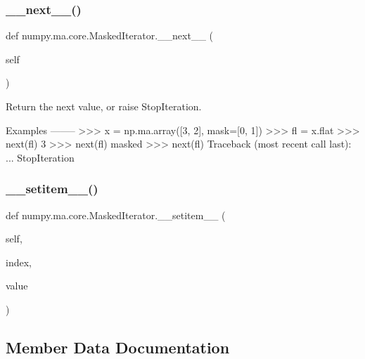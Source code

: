 \subsubsection{\texorpdfstring{\+\_\+\+\_\+next\+\_\+\+\_\+()}{\_\_next\_\_()}}
{\footnotesize\ttfamily def numpy.\+ma.\+core.\+Masked\+Iterator.\+\_\+\+\_\+next\+\_\+\+\_\+ (\begin{DoxyParamCaption}\item[{}]{self }\end{DoxyParamCaption})}

\begin{DoxyVerb}Return the next value, or raise StopIteration.

Examples
--------
>>> x = np.ma.array([3, 2], mask=[0, 1])
>>> fl = x.flat
>>> next(fl)
3
>>> next(fl)
masked
>>> next(fl)
Traceback (most recent call last):
  ...
StopIteration\end{DoxyVerb}
 \mbox{\label{classnumpy_1_1ma_1_1core_1_1MaskedIterator_a9d010e3bb8b98b905e2eb658a376544d}} 
\subsubsection{\texorpdfstring{\+\_\+\+\_\+setitem\+\_\+\+\_\+()}{\_\_setitem\_\_()}}
{\footnotesize\ttfamily def numpy.\+ma.\+core.\+Masked\+Iterator.\+\_\+\+\_\+setitem\+\_\+\+\_\+ (\begin{DoxyParamCaption}\item[{}]{self,  }\item[{}]{index,  }\item[{}]{value }\end{DoxyParamCaption})}



\subsection{Member Data Documentation}
\mbox{\label{classnumpy_1_1ma_1_1core_1_1MaskedIterator_a863465dfe0e9e0f22c2e69e3531b47b7}} 
